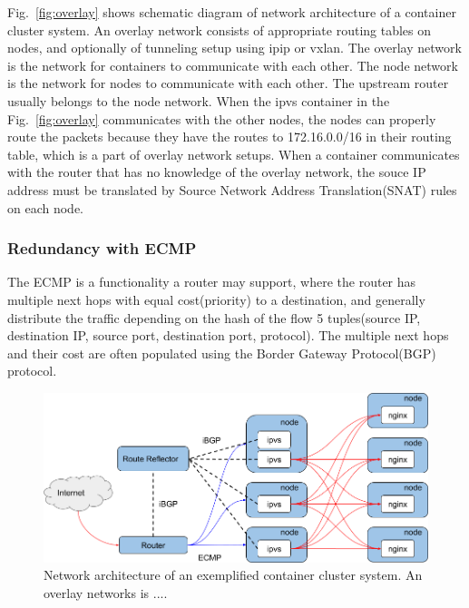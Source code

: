 Fig.~\ref{fig:overlay} shows schematic diagram of network architecture of a container cluster system. 
An overlay network consists of appropriate routing tables on nodes, and optionally of tunneling setup using ipip or vxlan.
The overlay network is the network for containers to communicate with each other. 
The node network is the network for nodes to communicate with each other. 
The upstream router usually belongs to the node network.
When the ipvs container in the Fig.~\ref{fig:overlay} communicates with the other nodes, 
the nodes can properly route the packets because they have the routes to 172.16.0.0/16 in their routing table, 
which is a part of overlay network setups.
When a container communicates with the router that has no knowledge of the overlay network, the souce IP address must be translated by Source Network Address Translation(SNAT) rules on each node.

\subsubsection{Redundancy with ECMP}

The ECMP is a functionality a router may support, where the router has multiple next hops with equal cost(priority) to a destination, and generally distribute the traffic depending on the hash of the flow 5 tuples(source IP, destination IP, source port, destination port, protocol).
The multiple next hops and their cost are often populated using the Border Gateway Protocol(BGP) protocol.

\begin{figure}[tb]
\begin{center}
\includegraphics[width=\columnwidth]{Figs/ecmp.png}
\end{center}
\caption{Network architecture of an exemplified container cluster system. An overlay networks is .... }
\label{fig:ecmp}
\end{figure}

